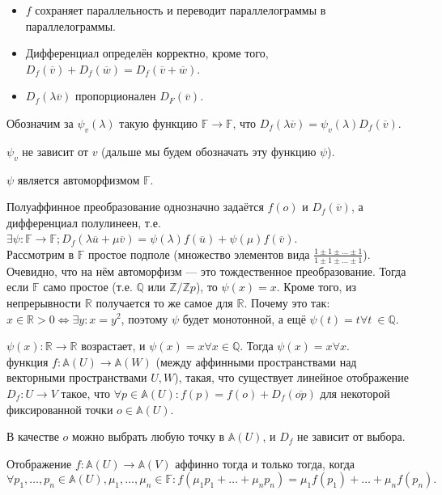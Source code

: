 \documentclass[12pt,a4paper]{article}
\begin{document}
\begin{itemize}
	\item $f$ сохраняет параллельность и переводит параллелограммы в параллелограммы.
	\item Дифференциал определён корректно, кроме того, $D_f(\overline{v})+D_f(\overline{w})=D_f(\overline{v}+\overline{w})$.
	\item $D_f(\lambda\overline{v})$ пропорционален $D_F(\overline{v})$.
\end{itemize}

Обозначим за $\psi_v(\lambda)$ такую функцию $\mathbb F\to \mathbb F$, что $D_f(\lambda\overline{v})=\psi_v(\lambda)D_f(\overline{v})$.

\lemma $\psi_v$ не зависит от $v$ (дальше мы будем обозначать эту функцию $\psi$).

\lemma $\psi$ является автоморфизмом $\mathbb F$.

\lemma Полуаффинное преобразование однозначно задаётся $f(o)$ и $D_f(\overline{v})$, а дифференциал полулинеен, т.е. $\exists \psi:\mathbb F\to \mathbb F;D_f(\lambda \overline{u}+\mu \overline{v})=\psi(\lambda)f(\overline{u})+\psi(\mu)f(\overline{v})$.\\

Рассмотрим в $\mathbb F$ простое подполе (множество элементов вида $\frac{1\pm1\pm\ldots \pm1}{1\pm1\pm\ldots \pm 1}$). Очевидно, что на нём автоморфизм --- это тождественное преобразование. Тогда если $\mathbb F$ само простое (т.е. $\mathbb Q$ или $\mathbb Z /\mathbb Zp$), то $\psi(x)=x$. Кроме того, из непрерывности $\mathbb R$ получается то же самое для $\mathbb R$. Почему это так: $x\in\mathbb R>0\iff \exists y:x=y^2$, поэтому $\psi$ будет монотонной, а ещё $\psi(t)=t\forall t\ \in \mathbb Q$.

 $\psi(x):\mathbb R\to \mathbb R$ возрастает, и $\psi(x)=x\forall x\in\mathbb Q$. Тогда $\psi(x)=x\forall x$.\\

 функция $f:\mathbb A(U)\to \mathbb A(W)$ (между аффинными пространствами над векторными пространствами $U,W$), такая, что существует линейное отображение $D_f:U\to V$ такое, что $\forall p\in \mathbb A(U):f(p)=f(o)+D_f(\overline{op})$ для некоторой фиксированной точки $o\in\mathbb A(U)$.

\lemma В качестве $o$ можно выбрать любую точку в $\mathbb A(U)$, и $D_f$ не зависит от выбора.

\lemma Отображение $f:\mathbb A(U)\to \mathbb A(V)$ аффинно тогда и только тогда, когда \[
	\forall p_1,\ldots ,p_n\in \mathbb A(U),\mu_1,\ldots ,\mu_n\in\mathbb F:f(\mu_1p_1+\ldots +\mu_np_n)=\mu_1f(p_1)+\ldots +\mu_nf(p_n)
.\]
\end{document}
